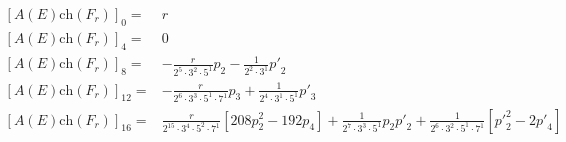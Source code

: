 \documentclass{amsart}
\theoremstyle{plain}
\newcommand{\ch}{\mathrm{ch}}
\numberwithin{equation}{section}
\newtheorem{ex}{Expansion}
\begin{document}
\begin{tcolorbox}[text width=16cm, height=3.7cm,
title=Twisted A-genus with both bundles having String structures]
{\footnotesize
\begin{align*} 
 {[A(E)\ch(F_r)]}_0 = &r
\\
 {[A(E)\ch(F_r)]}_4 = &0 
\\
 {[A(E)\ch(F_r)]}_8 = & -\tfrac{r}{2^5\cdot 3^2\cdot 5^1}  p_2
-\tfrac{1}{2^2\cdot 3^1}  {p'}_2
\\
 {[A(E)\ch(F_r)]}_{12} = &-
 \tfrac{r}{2^6\cdot 3^3\cdot 5^1\cdot 7^1}p_3
  +\tfrac{1}{2^4\cdot 3^1\cdot 5^1}  {p'}_3
\\
 {[A(E)\ch(F_r)]}_{16} = &
 \tfrac{r}{2^{15}\cdot 3^4\cdot 5^2\cdot 7^1}
  [ 208 p_2^2 -192 p_4]
 +\tfrac{1}{2^7\cdot 3^3\cdot 5^1} p_2  {p'}_2
   +\tfrac{1}{2^6\cdot 3^2\cdot 5^1\cdot 7^1} [ {p'}_2^2-2 {p'}_4]
\end{align*}
}
\end{tcolorbox}








%
%
%
%
%
%
%




\end{document}
